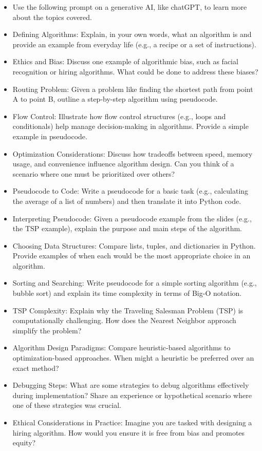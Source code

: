 \documentclass[
  letterpaper,
  DIV=11,
  numbers=noendperiod]{scrreprt}
\begin{document}
\begin{itemize}
\item
  Use the following prompt on a generative AI, like chatGPT, to learn
  more about the topics covered.
\item
  Defining Algorithms: Explain, in your own words, what an algorithm is
  and provide an example from everyday life (e.g., a recipe or a set of
  instructions).
\item
  Ethics and Bias: Discuss one example of algorithmic bias, such as
  facial recognition or hiring algorithms. What could be done to address
  these biases?
\item
  Routing Problem: Given a problem like finding the shortest path from
  point A to point B, outline a step-by-step algorithm using pseudocode.
\item
  Flow Control: Illustrate how flow control structures (e.g., loops and
  conditionals) help manage decision-making in algorithms. Provide a
  simple example in pseudocode.
\item
  Optimization Considerations: Discuss how tradeoffs between speed,
  memory usage, and convenience influence algorithm design. Can you
  think of a scenario where one must be prioritized over others?
\item
  Pseudocode to Code: Write a pseudocode for a basic task (e.g.,
  calculating the average of a list of numbers) and then translate it
  into Python code.
\item
  Interpreting Pseudocode: Given a pseudocode example from the slides
  (e.g., the TSP example), explain the purpose and main steps of the
  algorithm.
\item
  Choosing Data Structures: Compare lists, tuples, and dictionaries in
  Python. Provide examples of when each would be the most appropriate
  choice in an algorithm.
\item
  Sorting and Searching: Write pseudocode for a simple sorting algorithm
  (e.g., bubble sort) and explain its time complexity in terms of Big-O
  notation.
\item
  TSP Complexity: Explain why the Traveling Salesman Problem (TSP) is
  computationally challenging. How does the Nearest Neighbor approach
  simplify the problem?
\item
  Algorithm Design Paradigms: Compare heuristic-based algorithms to
  optimization-based approaches. When might a heuristic be preferred
  over an exact method?
\item
  Debugging Steps: What are some strategies to debug algorithms
  effectively during implementation? Share an experience or hypothetical
  scenario where one of these strategies was crucial.
\item
  Ethical Considerations in Practice: Imagine you are tasked with
  designing a hiring algorithm. How would you ensure it is free from
  bias and promotes equity?
\end{itemize}
\end{document}
